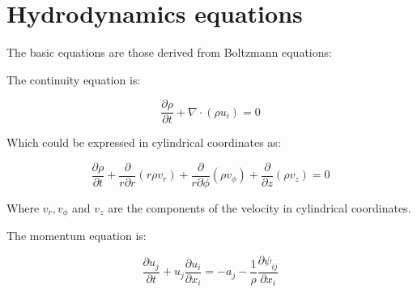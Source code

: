 \section*{Hydrodynamics equations}
The basic equations are those derived from Boltzmann equations:

The continuity equation is:

\begin{equation}
\dfrac{\partial \rho}{\partial t} + \nabla \cdot (\rho u_i) = 0
\end{equation}

Which could be expressed in cylindrical coordinates as:

\begin{equation}
\dfrac{\partial \rho}{\partial t} + \dfrac{\partial}{r \partial r}(r
\rho v_r) + \dfrac{\partial}{r \partial \phi}(\rho v_{\phi}) +
\dfrac{\partial}{\partial z}(\rho v_z) = 0
\end{equation}

Where $v_r, v_\phi$ and $v_z$ are the components of the velocity in
cylindrical coordinates.

The momentum equation is:

\begin{equation}
\dfrac{\partial u_j}{\partial t} + u_j \dfrac{\partial u_i}{\partial
x_i} = -a_j - \dfrac{1}{\rho} \dfrac{\partial \psi_{ij}}{\partial x_i}
\end{equation}
